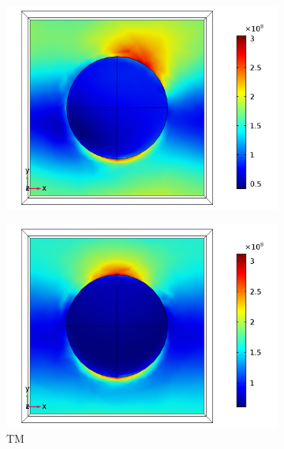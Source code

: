 \begin{figure}[htb!]
    \begin{subfigure}{0.32\textwidth}
        \centering
        \includegraphics[width=\linewidth]{figures/ch4/S5A/FieldDistribution/phi0-90/Sample5A_TM_Slice@z=0_wl=350_phi=65.png}
   \end{subfigure}
   \begin{subfigure}{0.32\textwidth}
        \centering
        \includegraphics[width=\linewidth]{figures/ch4/S5A/FieldDistribution/phi0-90/Sample5A_TM_Slice@z=0_wl=350_phi=90.png}
        \caption{TM}
        \vspace{-0.7cm}
   \end{subfigure}
   \begin{subfigure}{0.32\textwidth}

\end{subfigure}
\end{figure}
